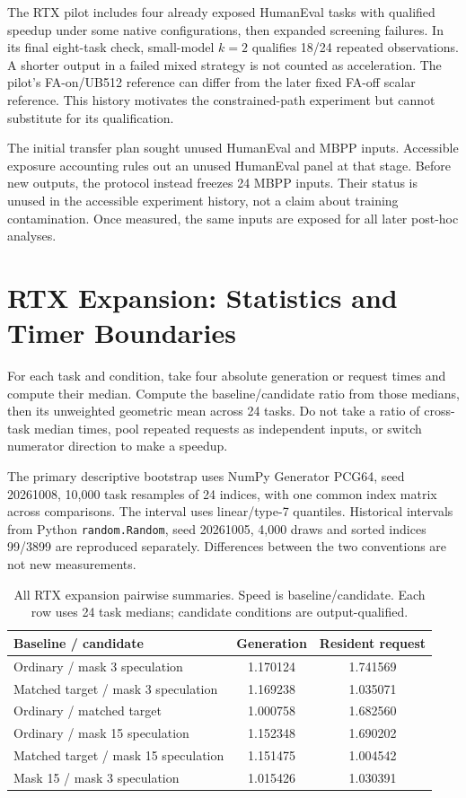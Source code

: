 \documentclass{article}
\begin{document}
The RTX pilot includes four already exposed HumanEval tasks with qualified speedup under some native configurations, then expanded screening failures. In its final eight-task check, small-model $k=2$ qualifies 18/24 repeated observations. A shorter output in a failed mixed strategy is not counted as acceleration. The pilot's FA-on/UB512 reference can differ from the later fixed FA-off scalar reference. This history motivates the constrained-path experiment but cannot substitute for its qualification.

The initial transfer plan sought unused HumanEval and MBPP inputs. Accessible exposure accounting rules out an unused HumanEval panel at that stage. Before new outputs, the protocol instead freezes 24 MBPP inputs. Their status is unused in the accessible experiment history, not a claim about training contamination. Once measured, the same inputs are exposed for all later post-hoc analyses.

\section{RTX Expansion: Statistics and Timer Boundaries}
For each task and condition, take four absolute generation or request times and compute their median. Compute the baseline/candidate ratio from those medians, then its unweighted geometric mean across 24 tasks. Do not take a ratio of cross-task median times, pool repeated requests as independent inputs, or switch numerator direction to make a speedup.

The primary descriptive bootstrap uses NumPy Generator PCG64, seed 20261008, 10,000 task resamples of 24 indices, with one common index matrix across comparisons. The interval uses linear/type-7 quantiles. Historical intervals from Python \texttt{random.Random}, seed 20261005, 4,000 draws and sorted indices 99/3899 are reproduced separately. Differences between the two conventions are not new measurements.

\begin{table}[t]\centering\small
\caption{All RTX expansion pairwise summaries. Speed is baseline/candidate. Each row uses 24 task medians; candidate conditions are output-qualified.}
\begin{tabular}{lcc}\toprule
Baseline / candidate & Generation & Resident request\\\midrule
Ordinary / mask 3 speculation & 1.170124 & 1.741569\\
Matched target / mask 3 speculation & 1.169238 & 1.035071\\
Ordinary / matched target & 1.000758 & 1.682560\\
Ordinary / mask 15 speculation & 1.152348 & 1.690202\\
Matched target / mask 15 speculation & 1.151475 & 1.004542\\
Mask 15 / mask 3 speculation & 1.015426 & 1.030391\\\bottomrule
\end{tabular}\end{table}
\end{document}
